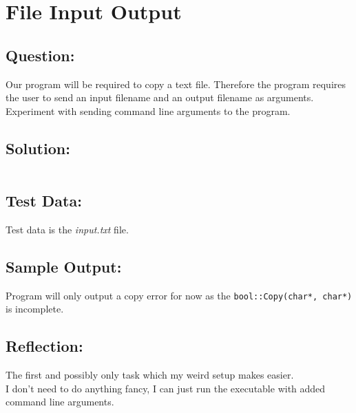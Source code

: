 \documentclass[Lab-C.tex]{subfiles}
\begin{document}
    \section{File Input Output}
        \subsection*{Question:}
            Our program will be required to copy a text file. Therefore the program requires the user to send an input filename and an output filename as arguments.
            Experiment with sending command line arguments to the program.
            
        \subsection*{Solution:}
            \inputminted{cpp}{../Tasks/01-FileIO/FileIO.cpp}%

        \subsection*{Test Data:}
            Test data is the \textit{input.txt} file.
        
        \subsection*{Sample Output:}
            Program will only output a copy error for now as the \texttt{bool::Copy(char*, char*)}
            is incomplete.

        \subsection*{Reflection:}
            The first and possibly only task which my weird setup makes easier. \\ 
            I don't need to do anything fancy, I can just run the executable
            with added command line arguments.
\end{document}
